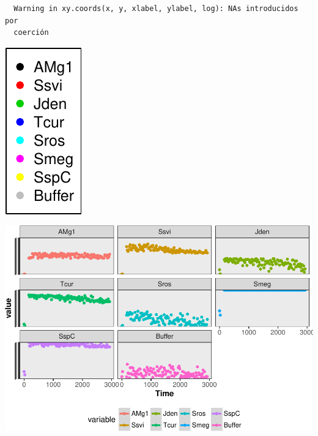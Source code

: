 \documentclass[12pt,twoside]{reedthesis}
\begin{document}
  \begin{verbatim}
  Warning in xy.coords(x, y, xlabel, ylabel, log): NAs introducidos por
  coerción
  \end{verbatim}
  
  \begin{center}\includegraphics{tesis_files/figure-latex/activity-1} \end{center}
  
  \begin{Shaded}
  \begin{Highlighting}[]
  \NormalTok{()}
  \NormalTok{(}\NormalTok{, } \OperatorTok{$} \OperatorTok{$}\NormalTok{)}
  \end{Highlighting}
  \end{Shaded}
  
  \begin{center}\includegraphics{tesis_files/figure-latex/activity-2} \end{center}
  
\end{document}
